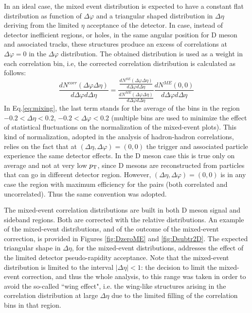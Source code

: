 In an ideal case, the mixed event distribution is expected to have a constant flat distribution as function of $\Delta\varphi$ and a triangular shaped distribution in $\Delta\eta$
deriving from the limited $\eta$ acceptance of the detector. In case, instead of detector inefficient regions, or holes, in the same angular position for D meson and associated tracks, these structures produce an excess of correlations at $\Delta\varphi=0$ in the $\Delta\varphi$ distribution. The obtained distribution is used as a weight in each correlation bin, i.e, the corrected correlation distribution is calculated as follows:
\begin{equation}
\label{eq:mixing}
\frac{dN^{corr}\left(\Delta\varphi \Delta\eta\right)}{d\Delta\varphi d\Delta\eta} = \frac{\frac{dN^{SE}\left(\Delta\varphi \Delta\eta\right)}{d\Delta\varphi d\Delta\eta} }{\frac{dN^{ME}\left(\Delta\varphi \Delta\eta\right)}{d\Delta\varphi d\Delta\eta} }\frac{dN^{ME}\left(0,  0\right)}{d\Delta\varphi d\Delta\eta}
\end{equation}
In Eq.\ref{eq:mixing}, the last term stands for the average of the bins in the region $-0.2 < \Delta\eta < 0.2$, $-0.2 < \Delta\varphi < 0.2$ (multiple bins are used to minimize the effect of statistical fluctuations on the normalization of the mixed-event plots).
This kind of normalization, adopted in the analysis of hadron-hadron correlations, relies on the fact that at $(\Delta\eta,\Delta\varphi)=(0,0)$ the trigger and associated particle experience the same detector effects. In the D meson case this is true only on average and not at very low $p_{\rm T}$, since D mesons are reconstructed from particles that can go
in different detector region. However, $(\Delta\eta,\Delta\varphi)=(0,0)$ is in any case
the region with maximum efficiency for the pairs (both correlated and uncorrelated). Thus the same convention was adopted.

The mixed-event correlation distributions are built in both D meson signal and sideband regions. Both are
corrected with the relative distributions. An example of the mixed-event distributions, and of the outcome of the mixed-event correction, is provided in Figures \ref{fig:DzeroME} and \ref{fig:Dsubtr2D}. The expected triangular shape in $\Delta\eta$, for the mixed-event distributions, addresses the effect of the limited detector pseudo-rapidity acceptance. Note that the mixed-event distribution is limited to the interval $\left|\Delta\eta\right|<1$: the decision to limit the mixed-event correction, and thus the whole analysis, to this range was taken in order to avoid the so-called ``wing effect", i.e. the wing-like structures arising in the correlation distribution at large $\Delta\eta$ due to the
limited filling of the correlation bins in that region.

